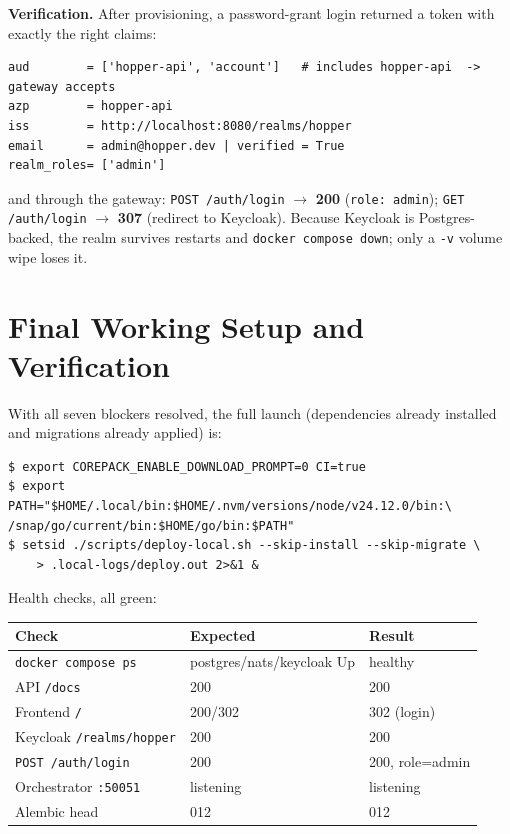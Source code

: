 \documentclass[11pt,a4paper]{article}
\newcommand{\code}[1]{\texttt{\small #1}}
\begin{document}
\textbf{Verification.} After provisioning, a password-grant login returned a token
with exactly the right claims:
\begin{lstlisting}
aud        = ['hopper-api', 'account']   # includes hopper-api  -> gateway accepts
azp        = hopper-api
iss        = http://localhost:8080/realms/hopper
email      = admin@hopper.dev | verified = True
realm_roles= ['admin']
\end{lstlisting}
and through the gateway: \code{POST /auth/login} $\rightarrow$ \textbf{200}
(\code{role: admin}); \code{GET /auth/login} $\rightarrow$ \textbf{307} (redirect
to Keycloak). Because Keycloak is Postgres-backed, the realm survives restarts and
\code{docker compose down}; only a \code{-v} volume wipe loses it.

\section{Final Working Setup and Verification}

With all seven blockers resolved, the full launch (dependencies already installed
and migrations already applied) is:
\begin{lstlisting}
$ export COREPACK_ENABLE_DOWNLOAD_PROMPT=0 CI=true
$ export PATH="$HOME/.local/bin:$HOME/.nvm/versions/node/v24.12.0/bin:\
/snap/go/current/bin:$HOME/go/bin:$PATH"
$ setsid ./scripts/deploy-local.sh --skip-install --skip-migrate \
    > .local-logs/deploy.out 2>&1 &
\end{lstlisting}

\noindent
Health checks, all green:

\begin{center}
\begin{tabular}{@{}lll@{}}
\toprule
\textbf{Check} & \textbf{Expected} & \textbf{Result} \\
\midrule
\code{docker compose ps}            & postgres/nats/keycloak Up & healthy \\
API \code{/docs}                    & 200 & 200 \\
Frontend \code{/}                   & 200/302 & 302 (login) \\
Keycloak \code{/realms/hopper}      & 200 & 200 \\
\code{POST /auth/login}             & 200 & 200, role=admin \\
Orchestrator \code{:50051}          & listening & listening \\
Alembic head                        & 012 & 012 \\
\bottomrule
\end{tabular}
\end{center}
\end{document}

